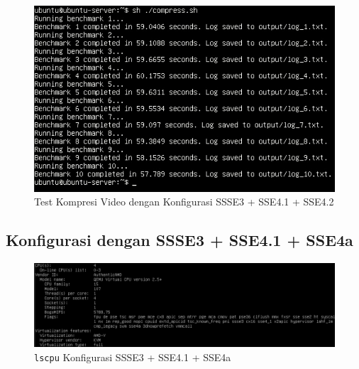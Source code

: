 \begin{figure}
    \centering
    \includegraphics[width=1\textwidth]
    {assets/pics/video-compression-test/ssse3,sse4.1,sse4.2.jpeg}
    \caption{Test Kompresi Video dengan Konfigurasi SSSE3 + SSE4.1 + SSE4.2}
    \label{fig:video_compression_test_ssse3,sse4.1,sse4.2}
\end{figure}

\subsection{Konfigurasi dengan SSSE3 + SSE4.1 + SSE4a}
\begin{figure}
    \centering
    \includegraphics[width=1\textwidth]
    {assets/pics/video-compression-test/lscpu_ssse3,sse4.1,sse4a.jpeg}
    \caption{\texttt{lscpu} Konfigurasi SSSE3 + SSE4.1 + SSE4a}
    \label{fig:lscpu_video_compression_test_ssse3,sse4.1,sse4a}
\end{figure}

